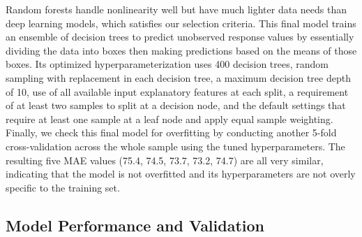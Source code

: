 \documentclass[12pt,letterpaper]{article} %
\begin{document}
Random forests handle nonlinearity well but have much lighter data needs than deep learning models, which satisfies our selection criteria. This final model trains an ensemble of decision trees to predict unobserved response values by essentially dividing the data into boxes then making predictions based on the means of those boxes. Its optimized hyperparameterization uses 400 decision trees, random sampling with replacement in each decision tree, a maximum decision tree depth of 10, use of all available input explanatory features at each split, a requirement of at least two samples to split at a decision node, and the default settings that require at least one sample at a leaf node and apply equal sample weighting. Finally, we check this final model for overfitting by conducting another 5-fold cross-validation across the whole sample using the tuned hyperparameters. The resulting five MAE values (75.4, 74.5, 73.7, 73.2, 74.7) are all very similar, indicating that the model is not overfitted and its hyperparameters are not overly specific to the training set.

\subsection{Model Performance and Validation}

\begin{table}[tb!]
    \centering\small
    \caption{Out-of-sample prediction accuracy of the 2023 model (chosen random forest model in bold) versus the initial naïve travel time model and the discarded alternative models, all validated against the corresponding 2023 Google travel times. $n$ = 8,272 for each. The six accuracy indicators are (1) MAPE \%, (2) MAE in seconds, (3) MSE in square seconds, (4) difference-in-means ($\delta$) in seconds and its corresponding $t$-test's $p$-value, (5) APR, and (6) $R^2$. See methods for mathematical definitions.}\label{tab:validation_results_2023}
\end{table}
\end{document}
